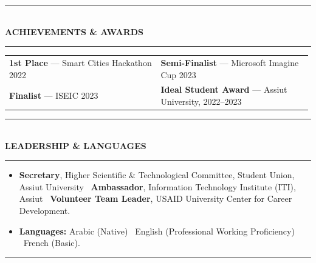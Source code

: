 \documentclass[10pt, a4paper]{article}
\makeatletter
\newcommand{\cvsection}[1]{%
  \vspace{3pt}%
  {\color{navy}\rule{\linewidth}{1.1pt}}\\[0.5pt]%
  {\color{navy}\bfseries\fontsize{9.5}{11}\selectfont\uppercase{#1}}\\[-4pt]%
  {\color{teal}\rule{\linewidth}{0.6pt}}%
  \vspace{2pt}%
}
\newenvironment{cvitems}{%
  \begin{itemize}[leftmargin=11pt, itemsep=0.5pt, parsep=0pt, topsep=1pt,
                  label={\textcolor{teal}{$\bullet$}}]
}{%
  \end{itemize}%
}
\newenvironment{dualcol}{%
  \begin{tabular*}{\linewidth}{@{}p{0.495\linewidth}@{\hspace{0.01\linewidth}}p{0.495\linewidth}@{}}
}{%
  \end{tabular*}%
}
\makeatother
\begin{document}
\cvsection{Achievements \& Awards}

\begin{dualcol}
  \textbf{1st Place} --- Smart Cities Hackathon 2022 &
  \textbf{Semi-Finalist} --- Microsoft Imagine Cup 2023 \\[2pt]
  \textbf{Finalist} --- ISEIC 2023 &
  \textbf{Ideal Student Award} --- Assiut University, 2022--2023 \\
\end{dualcol}

\cvsection{Leadership \& Languages}

\begin{cvitems}
  \item \textbf{Secretary}, Higher Scientific \& Technological Committee, Student Union, Assiut University \textperiodcentered\ \textbf{Ambassador}, Information Technology Institute (ITI), Assiut \textperiodcentered\ \textbf{Volunteer Team Leader}, USAID University Center for Career Development.
  \item \textbf{Languages:} Arabic (Native) \textperiodcentered\ English (Professional Working Proficiency) \textperiodcentered\ French (Basic).
\end{cvitems}

\vspace{3pt}
{\color{navy}\rule{\linewidth}{0.8pt}}
\end{document}
